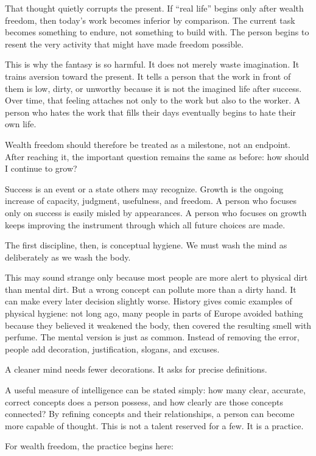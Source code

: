 That thought quietly corrupts the present. If ``real life'' begins only after wealth freedom, then today's work becomes inferior by comparison. The current task becomes something to endure, not something to build with. The person begins to resent the very activity that might have made freedom possible.

This is why the fantasy is so harmful. It does not merely waste imagination. It trains aversion toward the present. It tells a person that the work in front of them is low, dirty, or unworthy because it is not the imagined life after success. Over time, that feeling attaches not only to the work but also to the worker. A person who hates the work that fills their days eventually begins to hate their own life.

Wealth freedom should therefore be treated as a milestone, not an endpoint. After reaching it, the important question remains the same as before: how should I continue to grow?

Success is an event or a state others may recognize. Growth is the ongoing increase of capacity, judgment, usefulness, and freedom. A person who focuses only on success is easily misled by appearances. A person who focuses on growth keeps improving the instrument through which all future choices are made.

The first discipline, then, is conceptual hygiene. We must wash the mind as deliberately as we wash the body.

This may sound strange only because most people are more alert to physical dirt than mental dirt. But a wrong concept can pollute more than a dirty hand. It can make every later decision slightly worse. History gives comic examples of physical hygiene: not long ago, many people in parts of Europe avoided bathing because they believed it weakened the body, then covered the resulting smell with perfume. The mental version is just as common. Instead of removing the error, people add decoration, justification, slogans, and excuses.

A cleaner mind needs fewer decorations. It asks for precise definitions.

A useful measure of intelligence can be stated simply: how many clear, accurate, correct concepts does a person possess, and how clearly are those concepts connected? By refining concepts and their relationships, a person can become more capable of thought. This is not a talent reserved for a few. It is a practice.

For wealth freedom, the practice begins here:

